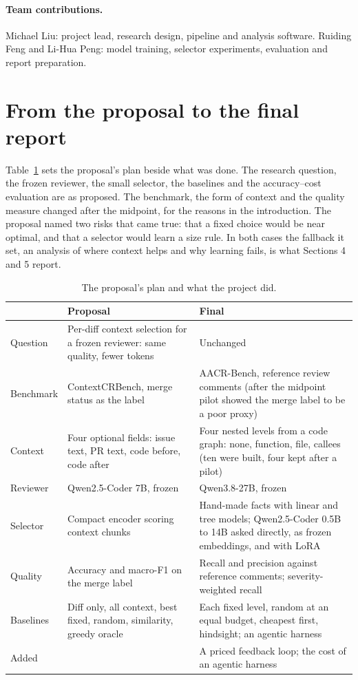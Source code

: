 \documentclass{article}
\begin{document}
\paragraph{Team contributions.} Michael Liu: project lead, research design, pipeline and analysis software. Ruiding Feng and Li-Hua Peng: model training, selector experiments, evaluation and report preparation.




\appendix
\section{From the proposal to the final report}
\label{app:plan}
Table~\ref{tab:plan} sets the proposal's plan beside what was done. The research question, the frozen reviewer, the small selector, the baselines and the accuracy--cost evaluation are as proposed. The benchmark, the form of context and the quality measure changed after the midpoint, for the reasons in the introduction. The proposal named two risks that came true: that a fixed choice would be near optimal, and that a selector would learn a size rule. In both cases the fallback it set, an analysis of where context helps and why learning fails, is what Sections 4 and 5 report.

\begin{table}[h]
\caption{The proposal's plan and what the project did.}
\label{tab:plan}
\centering
\small
\begin{tabular}{p{}p{}p{}}
\toprule
 & Proposal & Final\\
\midrule
Question & Per-diff context selection for a frozen reviewer: same quality, fewer tokens & Unchanged\\
Benchmark & ContextCRBench, merge status as the label & AACR-Bench, reference review comments (after the midpoint pilot showed the merge label to be a poor proxy)\\
Context & Four optional fields: issue text, PR text, code before, code after & Four nested levels from a code graph: none, function, file, callees (ten were built, four kept after a pilot)\\
Reviewer & Qwen2.5-Coder 7B, frozen & Qwen3.8-27B, frozen\\
Selector & Compact encoder scoring context chunks & Hand-made facts with linear and tree models; Qwen2.5-Coder 0.5B to 14B asked directly, as frozen embeddings, and with LoRA\\
Quality & Accuracy and macro-F1 on the merge label & Recall and precision against reference comments; severity-weighted recall\\
Baselines & Diff only, all context, best fixed, random, similarity, greedy oracle & Each fixed level, random at an equal budget, cheapest first, hindsight; an agentic harness\\
Added & & A priced feedback loop; the cost of an agentic harness\\
\bottomrule
\end{tabular}
\end{table}
\end{document}

